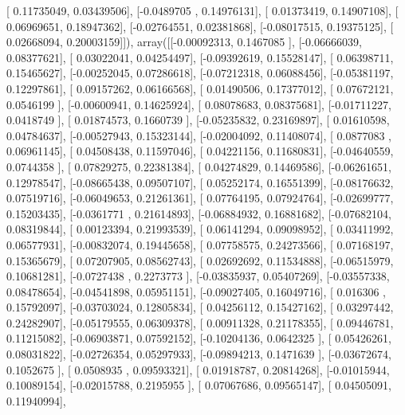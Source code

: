 \documentclass{article}
\begin{document}
       [ 0.11735049,  0.03439506],
       [-0.0489705 ,  0.14976131],
       [ 0.01373419,  0.14907108],
       [ 0.06969651,  0.18947362],
       [-0.02764551,  0.02381868],
       [-0.08017515,  0.19375125],
       [ 0.02668094,  0.20003159]]), array([[-0.00092313,  0.1467085 ],
       [-0.06666039,  0.08377621],
       [ 0.03022041,  0.04254497],
       [-0.09392619,  0.15528147],
       [ 0.06398711,  0.15465627],
       [-0.00252045,  0.07286618],
       [-0.07212318,  0.06088456],
       [-0.05381197,  0.12297861],
       [ 0.09157262,  0.06166568],
       [ 0.01490506,  0.17377012],
       [ 0.07672121,  0.0546199 ],
       [-0.00600941,  0.14625924],
       [ 0.08078683,  0.08375681],
       [-0.01711227,  0.0418749 ],
       [ 0.01874573,  0.1660739 ],
       [-0.05235832,  0.23169897],
       [ 0.01610598,  0.04784637],
       [-0.00527943,  0.15323144],
       [-0.02004092,  0.11408074],
       [ 0.0877083 ,  0.06961145],
       [ 0.04508438,  0.11597046],
       [ 0.04221156,  0.11680831],
       [-0.04640559,  0.0744358 ],
       [ 0.07829275,  0.22381384],
       [ 0.04274829,  0.14469586],
       [-0.06261651,  0.12978547],
       [-0.08665438,  0.09507107],
       [ 0.05252174,  0.16551399],
       [-0.08176632,  0.07519716],
       [-0.06049653,  0.21261361],
       [ 0.07764195,  0.07924764],
       [-0.02699777,  0.15203435],
       [-0.0361771 ,  0.21614893],
       [-0.06884932,  0.16881682],
       [-0.07682104,  0.08319844],
       [ 0.00123394,  0.21993539],
       [ 0.06141294,  0.09098952],
       [ 0.03411992,  0.06577931],
       [-0.00832074,  0.19445658],
       [ 0.07758575,  0.24273566],
       [ 0.07168197,  0.15365679],
       [ 0.07207905,  0.08562743],
       [ 0.02692692,  0.11534888],
       [-0.06515979,  0.10681281],
       [-0.0727438 ,  0.2273773 ],
       [-0.03835937,  0.05407269],
       [-0.03557338,  0.08478654],
       [-0.04541898,  0.05951151],
       [-0.09027405,  0.16049716],
       [ 0.016306  ,  0.15792097],
       [-0.03703024,  0.12805834],
       [ 0.04256112,  0.15427162],
       [ 0.03297442,  0.24282907],
       [-0.05179555,  0.06309378],
       [ 0.00911328,  0.21178355],
       [ 0.09446781,  0.11215082],
       [-0.06903871,  0.07592152],
       [-0.10204136,  0.0642325 ],
       [ 0.05426261,  0.08031822],
       [-0.02726354,  0.05297933],
       [-0.09894213,  0.1471639 ],
       [-0.03672674,  0.1052675 ],
       [ 0.0508935 ,  0.09593321],
       [ 0.01918787,  0.20814268],
       [-0.01015944,  0.10089154],
       [-0.02015788,  0.2195955 ],
       [ 0.07067686,  0.09565147],
       [ 0.04505091,  0.11940994],
\end{document}
